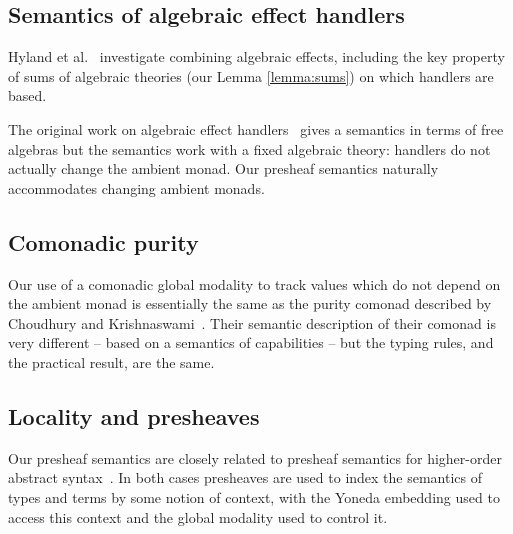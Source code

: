 \documentclass[acmsmall, screen, review, anonymous]{acmart}
\theoremstyle{definition}
\begin{document}
\subsection{Semantics of algebraic effect handlers}

Hyland et al.~\cite{hyland2006combining} investigate combining algebraic
effects, including the key property of sums of algebraic theories (our
Lemma \ref{lemma:sums}) on which handlers are based.

The original work on algebraic effect
handlers~\cite{plotkin2009handlers,plotkin2013handling} gives a semantics
in terms of free algebras but the semantics work with a fixed algebraic
theory: handlers do not actually change the ambient monad. Our presheaf
semantics naturally accommodates changing ambient monads.

\subsection{Comonadic purity}

Our use of a comonadic global modality to track values which do not
depend on the ambient monad is essentially the same as the purity
comonad described by Choudhury and
Krishnaswami~\cite{choudhury2020recovering}. Their semantic description
of their comonad is very different -- based on a semantics of
capabilities -- but the typing rules, and the practical result, are the
same.

\subsection{Locality and presheaves}

Our presheaf semantics are closely related to presheaf semantics for
higher-order abstract syntax~\cite{hu2022category}. In both cases
presheaves are used to index the semantics of types and terms by some
notion of context, with the Yoneda embedding used to access this context
and the global modality used to control it.

\pagebreak


\end{document}
